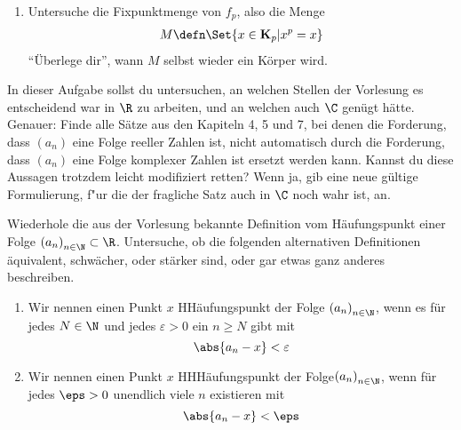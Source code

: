 \begin{prob}
\begin{enumerate}[label=(\alph*)]
  \item Untersuche die Fixpunktmenge von $f_p$, also die Menge
    \begin{equation*}
      \begin{split}
        M \defn \Set{x \in \mathbf{K}_p | x^p = x}
      \end{split}
    \end{equation*}
    \enquote{Überlege dir}, wann $M$ selbst wieder ein Körper wird.
  \end{enumerate}
\end{prob}

\begin{prob}
  In dieser Aufgabe sollst du untersuchen, an welchen Stellen der Vorlesung es
  entscheidend war in $\R$ zu arbeiten, und an welchen auch $\C$ genügt hätte.
  Genauer: Finde alle Sätze aus den Kapiteln 4, 5 und 7, bei denen die
  Forderung, dass $(a_n)$ eine Folge reeller Zahlen ist, nicht automatisch durch
  die Forderung, dass $(a_n)$ eine Folge komplexer Zahlen ist ersetzt werden
  kann. Kannst du diese Aussagen trotzdem leicht modifiziert retten? Wenn ja,
  gib eine neue gültige Formulierung, f"ur die der fragliche Satz auch in $\C$
  noch wahr ist, an.
\end{prob}

\begin{prob}
  Wiederhole die aus der Vorlesung bekannte Definition vom Häufungspunkt einer
  Folge $\left(a_n\right)_{n \in \N} \subset \R$. Untersuche, ob die folgenden
  alternativen Definitionen äquivalent, schwächer, oder stärker sind, oder gar
  etwas ganz anderes beschreiben.
  \begin{enumerate}[label=(\alph*)]
  \item Wir nennen einen Punkt $x$ HHäufungspunkt der Folge
    $\left(a_n\right)_{n\in\N}$, wenn es für jedes $N \in \N$ und jedes
    $\varepsilon > 0$ ein $n \geqslant N$ gibt mit
    \begin{equation*}
      \abs{a_n - x} < \varepsilon
    \end{equation*}
  \item Wir nennen einen Punkt $x$ HHHäufungspunkt der
    Folge$\left(a_n\right)_{n\in\N}$, wenn für jedes $\eps > 0$ unendlich viele
    $n$ existieren mit
    \begin{equation*}
      \abs{a_n - x} < \eps
    \end{equation*}
  \end{enumerate}
\end{prob}

